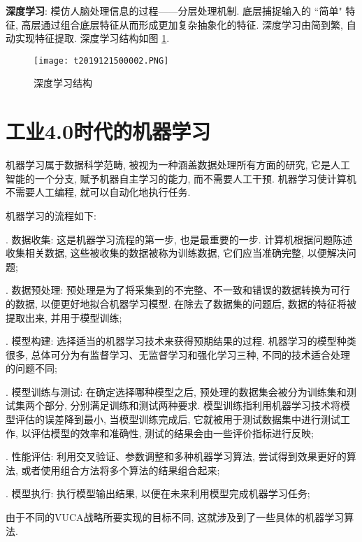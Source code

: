 \textbf{深度学习}: 模仿人脑处理信息的过程——分层处理机制.
底层捕捉输入的 “简单" 特征, 高层通过组合底层特征从而形成更加复杂抽象化的特征.
深度学习由简到繁, 自动实现特征提取. 深度学习结构如图 \ref{AI32fig2019121502}.
\begin{figure}[H]
\centering
\texttt{[image: t2019121500002.PNG]}
\caption{深度学习结构}
\label{AI32fig2019121502}
\end{figure}
\section{工业4.0时代的机器学习}

机器学习属于数据科学范畴, 被视为一种涵盖数据处理所有方面的研究, 它是人工智能的一个分支, 赋予机器自主学习的能力, 而不需要人工干预.
机器学习使计算机不需要人工编程, 就可以自动化地执行任务.

机器学习的流程如下:

. 数据收集: 这是机器学习流程的第一步, 也是最重要的一步. 计算机根据问题陈述收集相关数据, 这些被收集的数据被称为训练数据, 它们应当准确完整, 以便解决问题;

. 数据预处理: 预处理是为了将采集到的不完整、不一致和错误的数据转换为可行的数据, 以便更好地拟合机器学习模型. 在除去了数据集的问题后, 数据的特征将被提取出来, 并用于模型训练;

. 模型构建: 选择适当的机器学习技术来获得预期结果的过程. 机器学习的模型种类很多, 总体可分为有监督学习、无监督学习和强化学习三种, 不同的技术适合处理的问题不同;

. 模型训练与测试: 在确定选择哪种模型之后, 预处理的数据集会被分为训练集和测试集两个部分, 分别满足训练和测试两种要求.
模型训练指利用机器学习技术将模型评估的误差降到最小, 当模型训练完成后, 它就被用于测试数据集中进行测试工作, 以评估模型的效率和准确性, 测试的结果会由一些评价指标进行反映;

. 性能评估: 利用交叉验证、参数调整和多种机器学习算法, 尝试得到效果更好的算法, 或者使用组合方法将多个算法的结果组合起来;

. 模型执行: 执行模型输出结果, 以便在未来利用模型完成机器学习任务;

由于不同的VUCA战略所要实现的目标不同, 这就涉及到了一些具体的机器学习算法.
